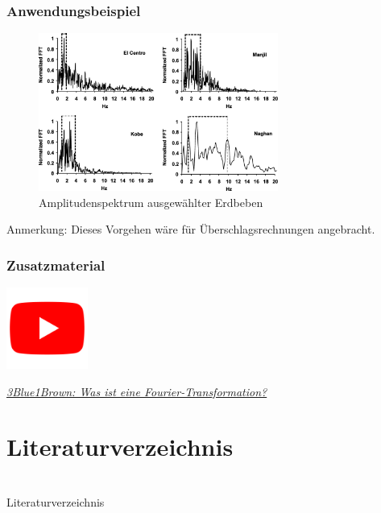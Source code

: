 \documentclass[hyperref={pdfpagemode=FullScreen, colorlinks=false}]{beamer}
\begin{document}
\begin{frame}
\frametitle{Anwendungsbeispiel}
\begin{figure}
 \includegraphics[width=0.7\textwidth]{fig_img/earthquake_spectra.jpg}
 \caption*{Amplitudenspektrum ausgewählter Erdbeben \cite{amiri2008}}
\end{figure}
Anmerkung: Dieses Vorgehen wäre für Überschlagsrechnungen angebracht.

\end{frame}



\begin{frame}
\frametitle{Zusatzmaterial} %
\vfill
\begin{center}
\includegraphics[width=0.2\textwidth]{fig_img/youtube.png}  

\href{https://www.youtube.com/watch?v=spUNpyF58BY}{\textsl{3Blue1Brown: Was ist eine Fourier-Transformation?}}
\end{center}  
\vfill
\end{frame}



\section{Literaturverzeichnis}

\section{} %
\begin{frame}[allowframebreaks]{Literaturverzeichnis}
	\printbibliography
\end{frame}
\end{document}
